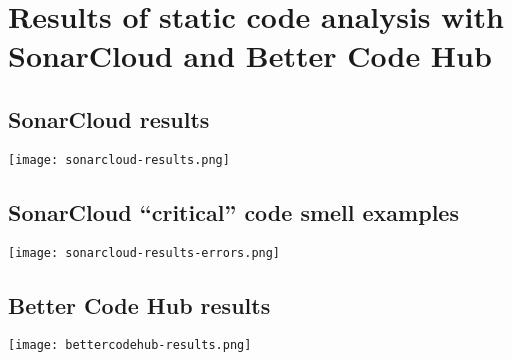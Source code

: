 \section{Results of static code analysis with SonarCloud and Better Code Hub}
\label{appendix:static-code-analysis-results}

\subsection{SonarCloud results}
\begin{center}
  \texttt{[image: sonarcloud-results.png]}
\end{center}

\subsection{SonarCloud ``critical'' code smell examples}
\begin{center}
  \texttt{[image: sonarcloud-results-errors.png]}
\end{center}

\subsection{Better Code Hub results}
\begin{center}
  \texttt{[image: bettercodehub-results.png]}
\end{center}

